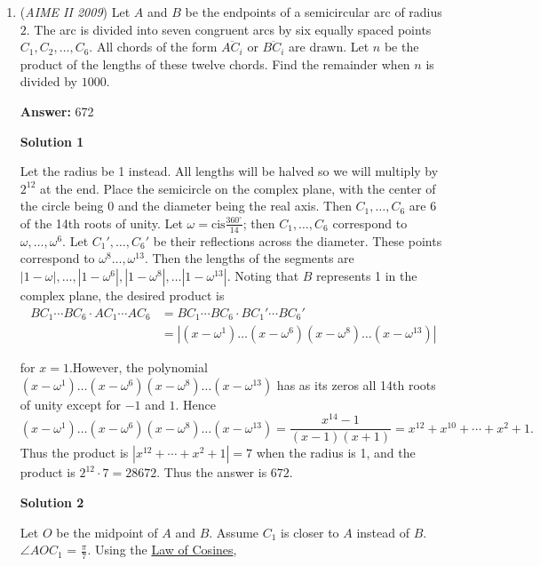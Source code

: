 \begin{enumerate}
 


 


	\item (\textit{AIME II 2009}) Let $A$ and $B$ be the endpoints of a semicircular arc of radius $2$. The arc is divided into seven congruent arcs by six equally spaced points $C_1,C_2,\dots,C_6$. All chords of the form $\overline{AC_i}$ or $\overline{BC_i}$ are drawn. Let $n$ be the product of the lengths of these twelve chords. Find the remainder when $n$ is divided by $1000$.


 
 \textbf{Answer: }672



\textbf{Solution 1}

Let the radius be 1 instead. All lengths will be halved so we will multiply by $2^{12}$ at the end. Place the semicircle on the complex plane, with the center of the circle being 0 and the diameter being the real axis. Then $C_1,\ldots, C_6$ are 6 of the 14th roots of unity. Let $\omega=\text{cis}\frac{360^{\circ}}{14}$; then $C_1,\ldots, C_6$ correspond to $\omega,\ldots, \omega^6$. Let $C_1',\ldots, C_6'$ be their reflections across the diameter. These points correspond to $\omega^8\ldots, \omega^{13}$. Then the lengths of the segments are $|1-\omega|,\ldots, |1-\omega^6|,|1-\omega^8|,\ldots |1-\omega^{13}|$. Noting that $B$ represents 1 in the complex plane, the desired product is
 \begin{align*} BC_1\cdots BC_6 \cdot AC_1\cdots AC_6&= BC_1\cdots BC_6 \cdot BC_1'\cdots BC_6'\\ &= |(x-\omega^1)\ldots(x-\omega^6)(x-\omega^8)\ldots(x-\omega^{13})| \end{align*}


 for $x=1$.However, the polynomial $(x-\omega^1)\ldots(x-\omega^6)(x-\omega^8)\ldots(x-\omega^{13})$ has as its zeros all 14th roots of unity except for $-1$ and $1$. Hence
 \[(x-\omega^1)\ldots(x-\omega^6)(x-\omega^8)\ldots(x-\omega^{13})=\frac{x^{14}-1}{(x-1)(x+1)}=x^{12}+x^{10}+\cdots +x^2+1.\]Thus the product is $|x^{12}+\cdots +x^2+1|=7$ when the radius is 1, and the product is $2^{12}\cdot 7=28672$. Thus the answer is $\boxed {672}$.

 



\textbf{Solution 2}

Let $O$ be the midpoint of $A$ and $B$. Assume $C_1$ is closer to $A$ instead of $B$.  $\angle AOC_1$ = $\frac {\pi}{7}$. Using the \href{https://artofproblemsolving.com/wiki/index.php?title=Law\_of\_Cosines}{Law of Cosines}, 


\end{enumerate}
